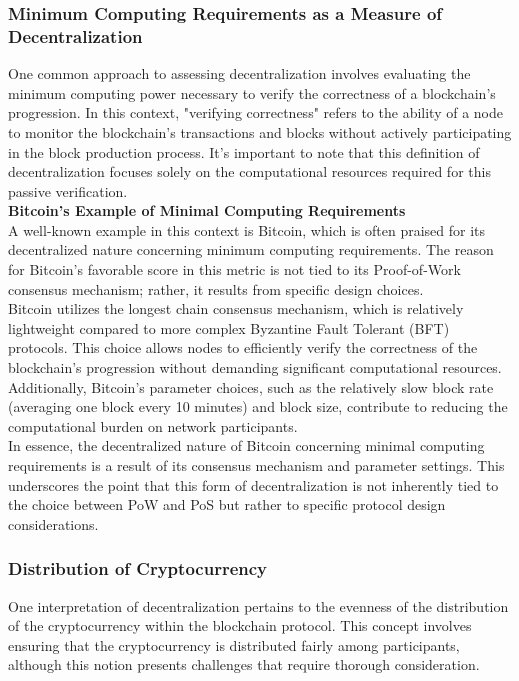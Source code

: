 \subsubsection{Minimum Computing Requirements as a Measure of Decentralization}

One common approach to assessing decentralization involves evaluating the minimum computing power necessary to verify the correctness of a blockchain's progression. In this context, "verifying correctness" refers to the ability of a node to monitor the blockchain's transactions and blocks without actively participating in the block production process. It's important to note that this definition of decentralization focuses solely on the computational resources required for this passive verification.\\

\noindent
\textbf{Bitcoin's Example of Minimal Computing Requirements}\\
A well-known example in this context is Bitcoin, which is often praised for its decentralized nature concerning minimum computing requirements. The reason for Bitcoin's favorable score in this metric is not tied to its Proof-of-Work consensus mechanism; rather, it results from specific design choices.\\
Bitcoin utilizes the longest chain consensus mechanism, which is relatively lightweight compared to more complex Byzantine Fault Tolerant (BFT) protocols. This choice allows nodes to efficiently verify the correctness of the blockchain's progression without demanding significant computational resources. Additionally, Bitcoin's parameter choices, such as the relatively slow block rate (averaging one block every 10 minutes) and block size, contribute to reducing the computational burden on network participants.\\
In essence, the decentralized nature of Bitcoin concerning minimal computing requirements is a result of its consensus mechanism and parameter settings. This underscores the point that this form of decentralization is not inherently tied to the choice between PoW and PoS but rather to specific protocol design considerations.

\subsubsection{Distribution of Cryptocurrency}
One interpretation of decentralization pertains to the evenness of the distribution of the cryptocurrency within the blockchain protocol. This concept involves ensuring that the cryptocurrency is distributed fairly among participants, although this notion presents challenges that require thorough consideration.\\

